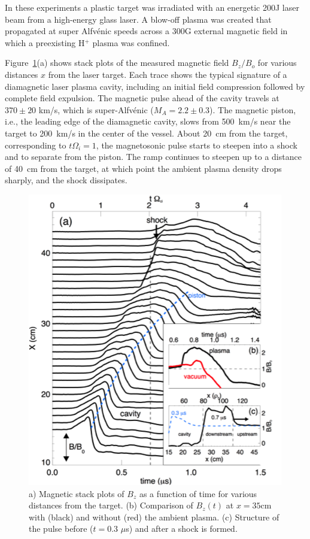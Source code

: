 \documentclass[11pt]{article}
\begin{document}
In these experiments a plastic target was irradiated with an energetic
200J laser beam from a high-energy glass laser. A blow-off plasma
was created that propagated at super Alfv\'{e}nic speeds across a 300G
external magnetic field in which a preexisting H$^+$ plasma was confined.


Figure~\ref{shock1}(a) shows stack plots of the measured magnetic field
$B_z/B_o$ for various
distances $x$ from the laser target. Each trace shows the typical
signature of a diamagnetic laser plasma cavity, including an initial
field compression followed by complete field expulsion. The magnetic
pulse ahead of the cavity travels at $370 \pm 20$ km/s, which is
super-Alfvénic ($M_A = 2.2 \pm 0.3$). The magnetic
piston, i.e., the leading edge of the diamagnetic cavity, slows from
500~km/s near the target to 200~km/s in the center of the vessel. About 20~cm from the target, corresponding to
$t \Omega_{i} =1$, the magnetosonic pulse starts to
steepen into a shock and to separate from the piston. The ramp continues
to steepen up to a distance of 40~cm from the target, at which point the
ambient plasma density drops sharply, and the shock dissipates. 
\begin{figure}
\begin{center}
\includegraphics[width=3.2truein]{shock1}
\caption{a) Magnetic stack plots of $B_{z}$ as a function of time for
  various distances from the target. (b) Comparison of $B_z(t)$ at $x
  = 35$cm with (black) and without (red) the ambient plasma. (c) Structure
  of the pulse before ($t = 0.3$ $\mu$s) and after a shock is formed.}\label{shock1}
\end{center}
\end{figure}
\end{document}

